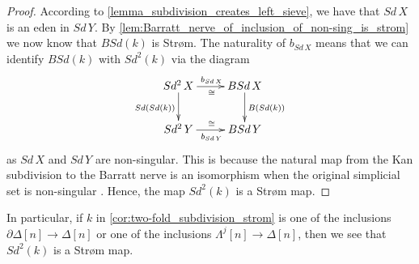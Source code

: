 \begin{proof}
According to \cref{lemma_subdivision_creates_left_sieve}, we have that $Sd\, X$ is an eden in $Sd\, Y$. By \cref{lem:Barratt_nerve_of_inclusion_of_non-sing_is_strom} we now know that $BSd(k)$ is Str\o m. The naturality of $b_{Sd\, X}$ means that we can identify $BSd(k)$ with $Sd^2(k)$ via the diagram
\begin{displaymath}
\xymatrix{
Sd^2\, X \ar[d]_{Sd(Sd(k))} \ar[r]^{b_{Sd\, X}}_\cong & BSd\, X \ar[d]^{B(Sd(k))} \\
Sd^2\, Y \ar[r]_{b_{Sd\, Y}}^\cong & BSd\, Y
}
\end{displaymath}
as $Sd\, X$ and $Sd\, Y$ are non-singular. This is because the natural map from the Kan subdivision to the Barratt nerve is an isomorphism when the original simplicial set is non-singular \cite[Lem.~2.2.11, p.~38]{WJR13}. Hence, the map $Sd^2(k)$ is a Str\o m map.
\end{proof}
\noindent In particular, if $k$ in \cref{cor:two-fold_subdivision_strom} is one of the inclusions $\partial \Delta [n]\to \Delta [n]$ or one of the inclusions $\Lambda ^j[n]\to \Delta [n]$, then we see that $Sd^2(k)$ is a Str\o m map.


